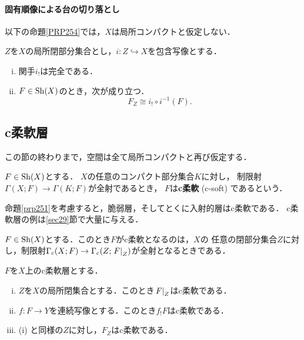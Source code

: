 \paragraph{固有順像による台の切り落とし}


以下の命題\ref{PRP254}では，\(X\)は局所コンパクトと仮定しない．

\begin{leftbar}
\begin{PRP}\label{PRP254}
    \(Z\)を\(X\)の局所閉部分集合とし，\(
        i\colon Z\hookrightarrow X
    \)を包含写像とする．
    \begin{enumerate}[(i)]
        \item 関手\(i_{!}\)は完全である．
        \item \(F\in\Sh(X)\)のとき，次が成り立つ．\[
            F_{Z}\cong i_{!}\circ i^{-1}(F).
        \]
    \end{enumerate}
\end{PRP}
\end{leftbar}

\subsection*{c柔軟層}

この節の終わりまで，空間は全て局所コンパクトと再び仮定する．

\begin{DFN}
    \(F\in\Sh(X)\)とする．
    \(X\)の任意のコンパクト部分集合\(K\)に対し，
    制限射\(\Gamma(X;F)\to \Gamma(K;F)\)が全射であるとき，
    \(F\)は\textbf{c柔軟} (c-soft) であるという．
\end{DFN}

命題\ref{prp251}を考慮すると，脆弱層，そしてとくに入射的層はc柔軟である．
c柔軟層の例は\ref{sec29}節で大量に与える．

\begin{leftbar}
\begin{PRP}\label{PRP256}
    \(F\in\Sh(X)\)とする．このとき\(F\)がc柔軟となるのは，\(X\)の
    任意の閉部分集合\(Z\)に対し，制限射\(
        \Gamma_{c}(X;F)\to \Gamma_{c}(Z;\mres[F]{Z})
    \)が全射となるときである．
\end{PRP}
\end{leftbar}

\begin{leftbar}
\begin{PRP}\label{PRP257}
    \(F\)を\(X\)上のc柔軟層とする．
    \begin{enumerate}[(i)]
        \item \(Z\)を\(X\)の局所閉集合とする．このとき\(\mres[F]{Z}\)はc柔軟である．
        \item \(f\colon F\to Y\)を連続写像とする．このとき\(f_{!}F\)はc柔軟である．
        \item (i) と同様の\(Z\)に対し，\(F_Z\)はc柔軟である．
    \end{enumerate}    
\end{PRP}
\end{leftbar}


